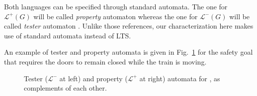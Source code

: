 Both languages can be specified through standard automata. The one for $\mathcal{L}^{+}(G)$ will be called \emph{property} automaton \cite{Letier:2005} whereas the one for $\mathcal{L}^{-}(G)$ will be called \emph{tester} automaton \cite{Giannakopoulou:2003}. Unlike those references, our characterization here makes use of standard automata instead of LTS.

An example of tester and property automata is given in Fig.~\ref{image:tester-and-property-automata} for the safety goal that requires the doors to remain closed while the train is moving.
\begin{figure}\centering
{}
\caption{Tester ($\mathcal{L}^{-}$ at left) and property ($\mathcal{L}^{+}$ at right) automata for , as complements of each other.\label{image:tester-and-property-automata}}
\end{figure}

